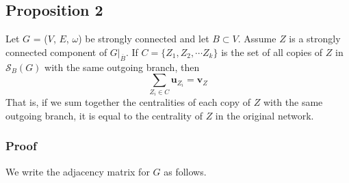 \documentclass{paper}
\begin{document}
\subsection*{Proposition 2}

Let $G$ = ($V$, $E$, $\omega$) be strongly connected and let $B \subset V$. Assume $Z$ is a strongly connected component of $G|_{\overline{B}}$. If $C = \{ Z_{1},Z_{2},\cdots Z_{k} \}$ is the set of all copies  of $Z$ in $\mathcal{S}_B(G)$ with the same outgoing branch, then
\[\sum_{Z_i \in C} \mathbf{u}_{Z_i} = \mathbf{v}_{Z}
\]
That is, if we sum together the centralities of each copy of $Z$ with the same outgoing branch, it is equal to the centrality of $Z$ in the original network.

\subsubsection*{Proof}

We write the adjacency matrix for $G$ as follows.
\end{document}
